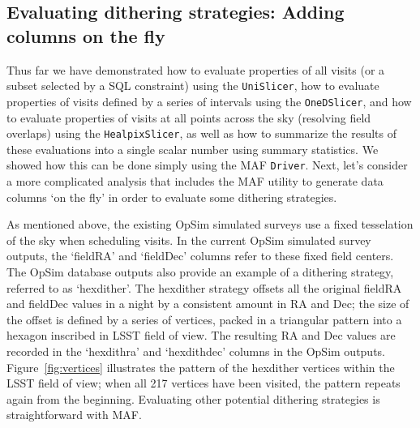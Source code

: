 \documentclass[]{spie}  %
\begin{document}
\subsection{Evaluating dithering strategies: Adding columns on the fly}

Thus far we have demonstrated how to evaluate properties of all visits
(or a subset selected by a SQL constraint) using the {\tt UniSlicer}, how to
evaluate properties of visits defined by a series of intervals using
the {\tt OneDSlicer}, and how to evaluate properties of visits at all points
across the sky (resolving field overlaps) using the {\tt HealpixSlicer}, as
well as how to summarize the results of these evaluations into a
single scalar number using summary statistics. We showed how this can
be done simply using the MAF {\tt Driver}. Next, let's consider a more
complicated analysis that includes the MAF utility to generate data
columns `on the fly' in order to evaluate some dithering strategies.

As mentioned above, the existing OpSim simulated surveys use a fixed
tesselation of the sky when scheduling visits. In the current OpSim
simulated survey outputs, the `fieldRA' and `fieldDec' columns refer
to these fixed field centers. The OpSim database outputs also provide
an example of a dithering strategy, referred to as `hexdither'. The
hexdither strategy offsets all the original fieldRA and fieldDec
values in a night by a consistent amount in RA and Dec; the size of
the offset is defined by a series of vertices, packed in a triangular
pattern into a hexagon inscribed in LSST field of view.  The resulting
RA and Dec values are recorded in the `hexdithra' and `hexdithdec'
columns in the OpSim outputs.  Figure~\ref{fig:vertices} illustrates
the pattern of the hexdither vertices within the LSST field of view;
when all 217 vertices have been visited, the pattern repeats again
from the beginning.  Evaluating other potential dithering strategies is
straightforward with MAF.
\end{document}
